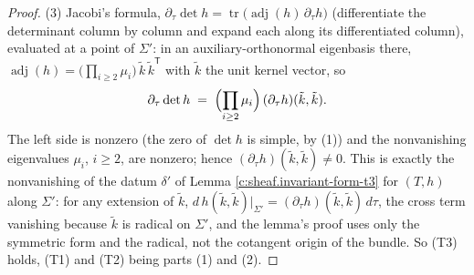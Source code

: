 \documentclass[11pt]{article}
\theoremstyle{definition}
\theoremstyle{plain}
\providecommand{\Sig}{}\renewcommand{\Sig}{\Sigma}
\begin{document}
\begin{proof}
(3) Jacobi's formula, $\partial_\tau \det h = \operatorname{tr}\bigl(\operatorname{adj}(h)\, \partial_\tau h\bigr)$ (differentiate the determinant column by column and expand each along its differentiated column), evaluated at a point of $\Sig'$: in an auxiliary-orthonormal eigenbasis there, $\operatorname{adj}(h) = \bigl(\prod_{i \geq 2} \mu_i\bigr)\, \tilde k\, \tilde k^{\mathsf T}$ with $\tilde k$ the unit kernel vector, so
\[
\partial_\tau \det h \;=\; \Bigl(\prod_{i \geq 2} \mu_i\Bigr)\, (\partial_\tau h)(\tilde k, \tilde k) .
\]
The left side is nonzero (the zero of $\det h$ is simple, by (1)) and the nonvanishing eigenvalues $\mu_i$, $i \geq 2$, are nonzero; hence $(\partial_\tau h)(\tilde k, \tilde k) \neq 0$. This is exactly the nonvanishing of the datum $\delta'$ of Lemma \ref{c:sheaf.invariant-form-t3} for $(T, h)$ along $\Sig'$: for any extension of $\tilde k$, $d\,h(\tilde k, \tilde k)|_{\Sig'} = (\partial_\tau h)(\tilde k, \tilde k)\, d\tau$, the cross term vanishing because $\tilde k$ is radical on $\Sig'$, and the lemma's proof uses only the symmetric form and the radical, not the cotangent origin of the bundle. So (T3) holds, (T1) and (T2) being parts (1) and (2).

\end{proof}
\end{document}
